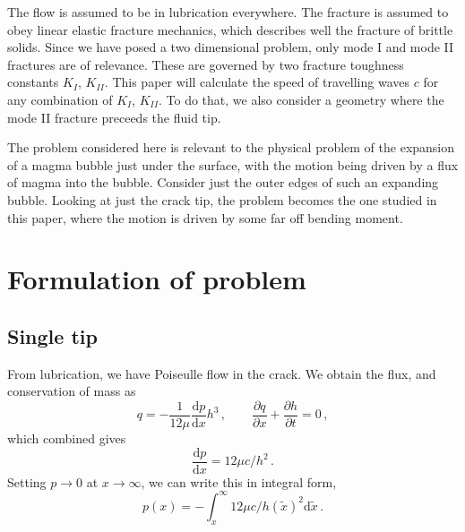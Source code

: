 \documentclass{jfm}
\newcommand{\mrd}{\mathrm{d}}
\begin{document}
The flow is assumed to be in lubrication everywhere. The fracture
is assumed to obey linear elastic fracture mechanics, which describes
well the fracture of brittle solids. Since we have posed a two dimensional
problem, only mode I and mode II fractures are of relevance. These are governed
by two fracture toughness constants $K_I$, $K_{II}$. This paper will calculate
the speed of travelling waves $c$ for any combination of $K_I$, $K_{II}$.
To do that, we also consider a geometry where the mode II fracture preceeds 
the fluid tip. 

The problem considered here is relevant to the physical problem of the 
expansion of a magma bubble just under the surface, 
with the motion being driven by a flux of magma into the bubble.
Consider just the outer edges of such an expanding bubble. Looking at just
the crack tip, the problem becomes the one studied in this paper, where the
motion is driven by some far off bending moment.


%
% 
\section{Formulation of problem}\label{sec:formulation_of_problem}
%
%
\subsection{Single tip}
From lubrication, we have Poiseulle flow in the crack. We obtain
the flux, and conservation of mass as 
\begin{equation}
q = - \frac{1}{12\mu}\frac{\mrd p}{\mrd x}h^3 \, , \qquad
\frac{\partial q}{\partial x} + \frac{\partial h}{\partial t} = 0 \, ,
\end{equation}
which combined gives
\begin{equation}
\frac{\mrd p}{\mrd x} = 12\mu c / h^2 \, .
\end{equation}
Setting $p\to 0$ at $x \to \infty$, we can write this in integral form,
\begin{equation}
p(x) = -\int_x^{\infty} 12\mu c / h(\tilde{x})^2 \mrd \tilde{x} \, .
\end{equation}
\end{document}
